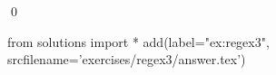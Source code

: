 
\begin{ex} 
  \label{ex:regex3}
  
  \qed
\end{ex} 
\begin{python0}
from solutions import *
add(label="ex:regex3",
    srcfilename='exercises/regex3/answer.tex') 
\end{python0}
